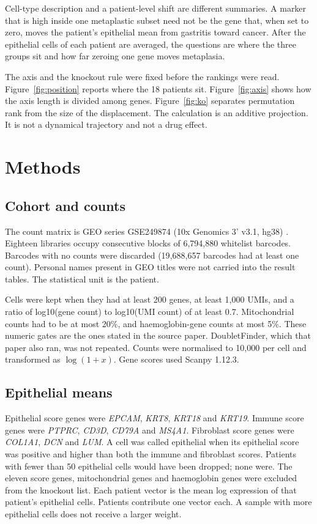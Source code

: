 \documentclass[11pt,a4paper]{article}
\begin{document}
Cell-type description and a patient-level shift are different summaries. A marker that is high inside one metaplastic subset need not be the gene that, when set to zero, moves the patient's epithelial mean from gastritis toward cancer. After the epithelial cells of each patient are averaged, the questions are where the three groups sit and how far zeroing one gene moves metaplasia.

The axis and the knockout rule were fixed before the rankings were read. Figure~\ref{fig:position} reports where the 18 patients sit. Figure~\ref{fig:axis} shows how the axis length is divided among genes. Figure~\ref{fig:ko} separates permutation rank from the size of the displacement. The calculation is an additive projection. It is not a dynamical trajectory and not a drug effect.

\section{Methods}

\subsection{Cohort and counts}

The count matrix is GEO series GSE249874 (10x Genomics 3' v3.1, hg38) \cite{li2025}. Eighteen libraries occupy consecutive blocks of 6{,}794{,}880 whitelist barcodes. Barcodes with no counts were discarded (19{,}688{,}657 barcodes had at least one count). Personal names present in GEO titles were not carried into the result tables. The statistical unit is the patient.

Cells were kept when they had at least 200 genes, at least 1{,}000 UMIs, and a ratio of log10(gene count) to log10(UMI count) of at least 0.7. Mitochondrial counts had to be at most 20\%, and haemoglobin-gene counts at most 5\%. These numeric gates are the ones stated in the source paper. DoubletFinder, which that paper also ran, was not repeated. Counts were normalised to 10{,}000 per cell and transformed as \(\log(1+x)\). Gene scores used Scanpy 1.12.3.

\subsection{Epithelial means}

Epithelial score genes were \textit{EPCAM}, \textit{KRT8}, \textit{KRT18} and \textit{KRT19}. Immune score genes were \textit{PTPRC}, \textit{CD3D}, \textit{CD79A} and \textit{MS4A1}. Fibroblast score genes were \textit{COL1A1}, \textit{DCN} and \textit{LUM}. A cell was called epithelial when its epithelial score was positive and higher than both the immune and fibroblast scores. Patients with fewer than 50 epithelial cells would have been dropped; none were. The eleven score genes, mitochondrial genes and haemoglobin genes were excluded from the knockout list. Each patient vector is the mean log expression of that patient's epithelial cells. Patients contribute one vector each. A sample with more epithelial cells does not receive a larger weight.
\end{document}
